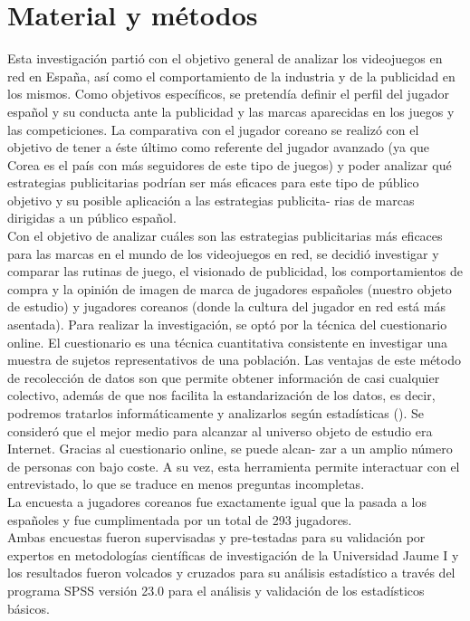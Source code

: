 \documentclass[a4paper,11pt]{article}
\begin{document}
\section{Material y métodos}
Esta investigación partió con el objetivo general de analizar los videojuegos en red en España, así como el comportamiento de la industria y de la publicidad en los mismos. Como objetivos específicos, se pretendía definir el perfil del jugador español y su conducta ante la publicidad y las marcas aparecidas en los juegos y las competiciones. La comparativa con el jugador coreano se realizó con el objetivo de tener a éste último como referente del jugador avanzado (ya que Corea es el país con más seguidores de este tipo de juegos) y poder analizar qué estrategias publicitarias podrían ser más eficaces para este tipo de público objetivo y su posible aplicación a las estrategias publicita- rias de marcas dirigidas a un público español.\\
Con el objetivo de analizar cuáles son las estrategias publicitarias más eficaces para las marcas en el mundo de los videojuegos en red, se decidió investigar y comparar las rutinas de juego, el visionado de publicidad, los comportamientos de compra y la opinión de imagen de marca de jugadores españoles (nuestro objeto de estudio) y jugadores coreanos (donde la cultura del jugador en red está más asentada). Para realizar la investigación, se optó por la técnica del cuestionario online. El cuestionario es una técnica cuantitativa consistente en investigar una muestra de sujetos representativos de una población. Las ventajas de este método de recolección de datos son que permite obtener información de casi cualquier colectivo, además de que nos facilita la estandarización de los datos, es decir, podremos tratarlos informáticamente y analizarlos según estadísticas (\cite{Erik2015}). Se consideró que el mejor medio para alcanzar al universo objeto de estudio era Internet. Gracias al cuestionario online, se puede alcan- zar a un amplio número de personas con bajo coste. A su vez, esta herramienta permite interactuar con el entrevistado, lo que se traduce en menos preguntas incompletas.\\
La encuesta a jugadores coreanos fue exactamente igual que la pasada a los españoles y fue cumplimentada por un total de 293 jugadores.\\
Ambas encuestas fueron supervisadas y pre-testadas para su validación por expertos en metodologías científicas de investigación de la Universidad Jaume I y los resultados fueron volcados y cruzados para su análisis estadístico a través del programa SPSS versión 23.0 para el análisis y validación de los estadísticos básicos.
\end{document}
